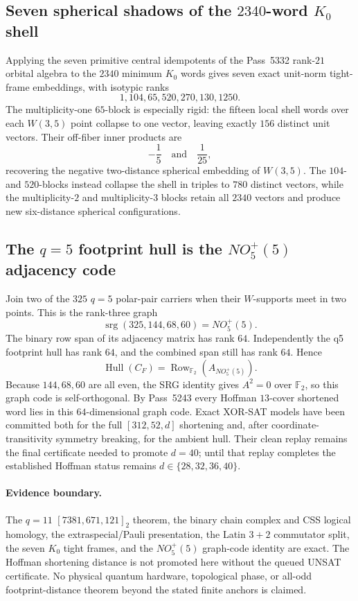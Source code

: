\subsection{Seven spherical shadows of the $2340$-word $K_0$ shell}
\label{sec:pass5353-k0-spherical}
Applying the seven primitive central idempotents of the Pass~5332 rank-$21$
orbital algebra to the $2340$ minimum $K_0$ words gives seven exact unit-norm
tight-frame embeddings, with isotypic ranks
\[
 1,104,65,520,270,130,1250.
\]
The multiplicity-one $65$-block is especially rigid: the fifteen local shell
words over each $W(3,5)$ point collapse to one vector, leaving exactly $156$
distinct unit vectors.  Their off-fiber inner products are
\[
 -\frac15\quad\text{and}\quad \frac1{25},
\]
recovering the negative two-distance spherical embedding of $W(3,5)$.  The
$104$- and $520$-blocks instead collapse the shell in triples to $780$ distinct
vectors, while the multiplicity-$2$ and multiplicity-$3$ blocks retain all
$2340$ vectors and produce new six-distance spherical configurations.

\subsection{The $q=5$ footprint hull is the $NO_5^+(5)$ adjacency code}
\label{sec:pass5348-no5-code}
Join two of the $325$ $q=5$ polar-pair carriers when their $W$-supports meet in
two points.  This is the rank-three graph
\[
 \operatorname{srg}(325,144,68,60)=NO_5^+(5).
\]
The binary row span of its adjacency matrix has rank $64$.  Independently the
q5 footprint hull has rank $64$, and the combined span still has rank $64$.
Hence
\[
 \boxed{\operatorname{Hull}(C_F)=\operatorname{Row}_{\mathbb F_2}(A_{NO_5^+(5)}).}
\]
Because $144,68,60$ are all even, the SRG identity gives
$A^2=0$ over $\mathbb F_2$, so this graph code is self-orthogonal.  By Pass~5243
every Hoffman $13$-cover shortened word lies in this $64$-dimensional graph
code.  Exact XOR-SAT models have been committed both for the full
$[312,52,d]$ shortening and, after coordinate-transitivity symmetry breaking,
for the ambient hull.  Their clean replay remains the final certificate needed
to promote $d=40$; until that replay completes the established Hoffman status
remains $d\in\{28,32,36,40\}$.

\paragraph{Evidence boundary.}
The $q=11$ $[7381,671,121]_2$ theorem, the binary chain complex and CSS logical
homology, the extraspecial/Pauli presentation, the Latin $3+2$ commutator split,
the seven $K_0$ tight frames, and the $NO_5^+(5)$ graph-code identity are exact.
The Hoffman shortening distance is not promoted here without the queued UNSAT
certificate.  No physical quantum hardware, topological phase, or all-odd
footprint-distance theorem beyond the stated finite anchors is claimed.
